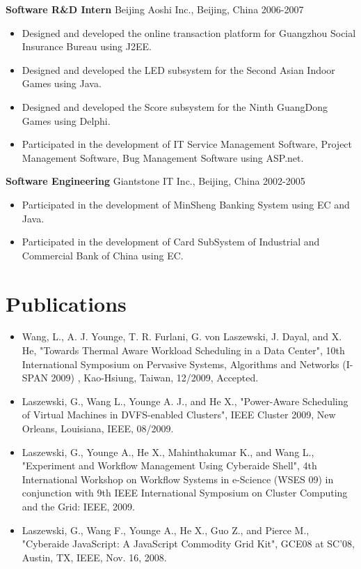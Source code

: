 \documentclass[margin]{res}
\begin{document}
\begin{resume}
{\bf Software R\&D Intern }  Beijing Aoshi Inc., Beijing, China 2006-2007
\begin{itemize}
\item Designed and developed the online transaction platform for Guangzhou Social Insurance Bureau using J2EE.
\item Designed and developed the LED subsystem for the Second Asian Indoor Games using Java.
\item Designed and developed the Score subsystem for the Ninth GuangDong Games using Delphi. 
\item Participated in the development of IT Service Management Software, Project Management Software, Bug Management Software using ASP.net. 
\end{itemize}
{\bf Software Engineering } Giantstone IT Inc., Beijing, China 2002-2005
\begin{itemize}
\item Participated in the development of MinSheng Banking System using EC and Java. 
\item Participated in the development of Card SubSystem of Industrial and Commercial Bank of China using EC.
\end{itemize}

\section{Publications}

\begin{itemize}
\item Wang, L., A. J. Younge, T. R. Furlani, G. von Laszewski, J. Dayal, and X. He, "Towards Thermal Aware Workload Scheduling in a Data Center", 10th International Symposium on Pervasive Systems, Algorithms and Networks (I-SPAN 2009) , Kao-Hsiung, Taiwan, 12/2009, Accepted.
\item Laszewski, G., Wang L., Younge A. J., and He X.,  "Power-Aware Scheduling of Virtual Machines in DVFS-enabled Clusters",  IEEE Cluster 2009, New Orleans, Louisiana, IEEE, 08/2009.
\item Laszewski, G., Younge A., He X., Mahinthakumar K., and Wang L.,  "Experiment and Workflow Management Using Cyberaide Shell",  4th International Workshop on Workflow Systems in e-Science (WSES 09) in conjunction with 9th IEEE International Symposium on Cluster Computing and the Grid: IEEE, 2009.
\item Laszewski, G., Wang F., Younge A., He X., Guo Z., and Pierce M.,  "Cyberaide JavaScript: A JavaScript Commodity Grid Kit",  GCE08 at SC'08, Austin, TX, IEEE, Nov. 16, 2008.
\end{itemize}


\end{resume}
\end{document}
